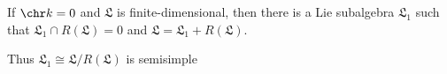 If $\chr k = 0$ and $\mathfrak{L}$ is finite-dimensional, then there is
a Lie subalgebra $\mathfrak{L}_1$ such that $\mathfrak{L}_1 \cap R(\mathfrak{L}) = 0$
and $\mathfrak{L} = \mathfrak{L}_1 + R(\mathfrak{L})$.

Thus $\mathfrak{L}_1\cong \mathfrak{L}/R(\mathfrak{L})$ is semisimple

